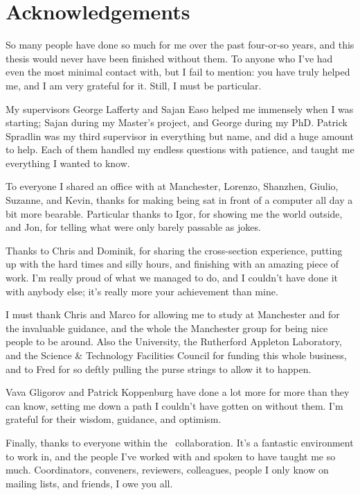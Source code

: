 \chapter{Acknowledgements}

So many people have done so much for me over the past four-or-so years, and 
this thesis would never have been finished without them.
To anyone who I've had even the most minimal contact with, but I fail to 
mention: you have truly helped me, and I am very grateful for it.
Still, I must be particular.

My supervisors George Lafferty and Sajan Easo helped me immensely when I was 
starting; Sajan during my Master's project, and George during my PhD.
Patrick Spradlin was my third supervisor in everything but name, and did a huge 
amount to help.
Each of them handled my endless questions with patience, and taught me 
everything I wanted to know.

To everyone I shared an office with at Manchester, Lorenzo, Shanzhen, Giulio, 
Suzanne, and Kevin, thanks for making being sat in front of a computer all day 
a bit more bearable.
Particular thanks to Igor, for showing me the world outside, and Jon, for 
telling what were only barely passable as jokes.

Thanks to Chris and Dominik, for sharing the cross-section experience, putting 
up with the hard times and silly hours, and finishing with an amazing piece of 
work.
I'm really proud of what we managed to do, and I couldn't have done it with 
anybody else; it's really more your achievement than mine.

I must thank Chris and Marco for allowing me to study at Manchester and for the 
invaluable guidance, and the whole the Manchester group for being nice people 
to be around.
Also the University, the Rutherford Appleton Laboratory, and the Science \& 
Technology Facilities Council for funding this whole business, and to Fred for 
so deftly pulling the purse strings to allow it to happen.

Vava Gligorov and Patrick Koppenburg have done a lot more for more than they 
can know, setting me down a path I couldn't have gotten on without them.
I'm grateful for their wisdom, guidance, and optimism.

Finally, thanks to everyone within the \lhcb\ collaboration.
It's a fantastic environment to work in, and the people I've worked with and 
spoken to have taught me so much. Coordinators, conveners, reviewers, 
colleagues, people I only know on mailing lists, and friends, I owe you all.
